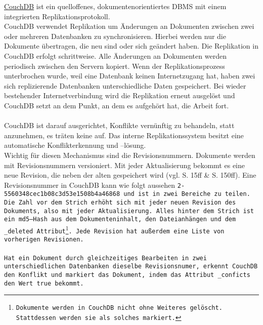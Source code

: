 \hyperref[chap:couch]{CouchDB} ist ein quelloffenes, dokumentenorientiertes \gls{DBMS} mit einem integrierten Replikationsprotokoll.\\
CouchDB verwendet Replikation um Änderungen an Dokumenten zwischen zwei oder mehreren Datenbanken zu synchronisieren.
Hierbei werden nur die Dokumente übertragen, die neu sind oder sich geändert haben.
Die Replikation in CouchDB erfolgt schrittweise. Alle Änderungen an Dokumenten werden periodisch zwischen den Servern kopiert.
Wenn der Replikationsprozess unterbrochen wurde, weil eine Datenbank keinen Internetzugang hat, haben zwei sich replizierende Datenbanken unterschiedliche Daten gespeichert.
Bei wieder bestehender Internetverbindung wird die Replikation erneut ausgelöst und CouchDB setzt an dem Punkt, an dem es aufgehört hat, die Arbeit fort.\\\\
%
%
CouchDB ist darauf ausgerichtet, Konflikte vernünftig zu behandeln, statt anzunehmen, es träten keine auf.
Das interne Replikationssystem besitzt eine automatische Konflikterkennung und --lösung.\\
Wichtig für diesen Mechanismus sind die Revisionsnummern.
Dokumente werden mit Revisionsnummern versioniert. Mit jeder Aktualisierung bekommt es eine neue Revision, die neben der alten gespeichert wird (vgl. \cite{couchDB} S. 15ff \& S. 150ff). 
Eine Revisionsnummer in CouchDB kann wie folgt aussehen \tt{2-5560348cec1b08c3d53e1508b4a46868} und ist in zwei Bereiche zu teilen. Die Zahl vor dem Strich erhöht sich mit jeder neuen Revision des Dokuments, also mit jeder Aktualisierung. Alles hinter dem Strich ist ein md5--\gls{Hash} aus dem Dokumenteninhalt, den Dateianhängen und dem \tt{\_deleted} Attribut\footnote{ Dokumente werden in CouchDB nicht ohne Weiteres gelöscht. Stattdessen werden sie als solches markiert.}.
Jede Revision hat außerdem eine Liste von vorherigen Revisionen.\\\\
%
%
Hat ein Dokument durch gleichzeitiges Bearbeiten in zwei unterschiedlichen Datenbanken dieselbe Revisionsnumer, erkennt CouchDB den Konflikt und markiert das Dokument, indem das Attribut \tt{\_conficts} den Wert \tt{true} bekommt.
